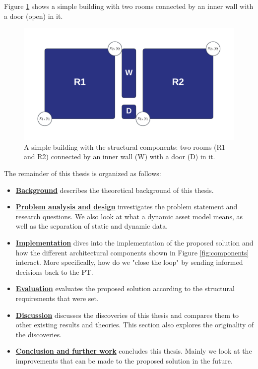 \documentclass{article}
\begin{document}
Figure \ref{fig:simple_building} shows a simple building with two rooms connected by an inner wall with a door (open) in it.

\begin{figure}[H]
    \centering
    \includegraphics[scale=0.3]{graphics/simple_building.png}
    \caption{A simple building with the structural components: two rooms (R1 and R2) connected by an inner wall (W) with a door (D) in it.}
    \label{fig:simple_building}
\end{figure}


The remainder of this thesis is organized as follows:
\begin{itemize}
    \item \hyperref[sec:Background]{\textbf{Background}} describes the theoretical background of this thesis.
    \item \hyperref[sec:Analysis]{\textbf{Problem analysis and design}} investigates the problem statement and research questions. We also look at what a dynamic asset model means, as well as the separation of static and dynamic data.
    \item \hyperref[sec:Implementation]{\textbf{Implementation}} dives into the implementation of the proposed solution and how the different architectural components shown in Figure \ref{fig:components} interact. More specifically, how do we "close the loop" by sending informed decisions back to the PT. 
    \item \hyperref[sec:Evaluation]{\textbf{Evaluation}} evaluates the proposed solution according to the structural requirements that were set.
    \item \hyperref[sec:Discussion]{\textbf{Discussion}} discusses the discoveries of this thesis and compares them to other existing results and theories. This section also explores the originality of the discoveries.
    \item \hyperref[sec:Conclusion]{\textbf{Conclusion and further work}} concludes this thesis. Mainly we look at the improvements that can be made to the proposed solution in the future.  
\end{itemize}
\end{document}
